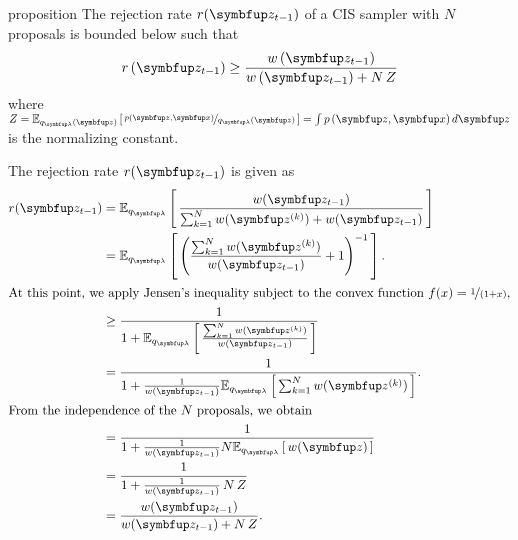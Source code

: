 
\begin{theoremEnd}[]{proposition}\label{thm:cis_bound}
  The rejection rate \(r(\vz_{t-1})\) of a CIS sampler with \(N\) proposals is bounded below such that
  \[
  r\,(\vz_{t-1}) \geq \frac{w\,(\vz_{t-1})}{w\,(\vz_{t-1}) + N\,Z}
  \]
  where \(Z=\Esub{q_{\vlambda}(\vz)}{\nicefrac{p(\vz,\vx)}{q_{\vlambda}(\vz)}} = \int p\,(\vz,\vx)\,d\vz\) is the normalizing constant.
\end{theoremEnd}
\begin{proofEnd}
  The rejection rate \(r(\vz_{t-1})\) is given as
  \begin{align}
    r(\vz_{t-1})
    &= \Esub{q_{\vlambda}}{ \frac{w(\vz_{t-1})}{ \sum^{N}_{k=1} w(\vz^{(k)}) + w(\vz_{t-1})} } \\
    &= \Esub{q_{\vlambda}}{ {\left( \frac{\sum^{N}_{k=1} w(\vz^{(k)}) }{ w(\vz_{t-1}) } + 1 \right)}^{-1} }.  \\
\intertext{At this point, we apply Jensen's inequality subject to the convex function \(f(x) = \nicefrac{1}{(1 + x)}\),}
    &\geq \frac{1}{1 + \Esub{q_{\vlambda}}{ \frac{\sum^{N}_{k=1} w(\vz^{(k)})}{w(\vz_{t-1})} } } \\
    &=    \frac{1}{1 + \frac{1}{w(\vz_{t-1})} \Esub{q_{\vlambda}}{ \sum^{N}_{k=1} w(\vz^{(k)}) } }. \\
\intertext{From the independence of the \(N\) proposals, we obtain}
    &=    \frac{1}{1 + \frac{1}{w(\vz_{t-1})} N \Esub{q_{\vlambda}}{ w(\vz) } } \\
    &=    \frac{1}{1 + \frac{1}{w(\vz_{t-1})}\,N\,Z } \\
    &=    \frac{w(\vz_{t-1})}{w(\vz_{t-1}) + N\,Z}. \\
  \end{align}
\end{proofEnd}

